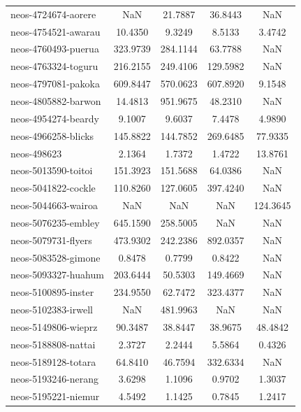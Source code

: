 \begin{longtable}{lcccc}
neos-4724674-aorere         &       NaN &  21.7887 &   36.8443 &       NaN \\
neos-4754521-awarau         &   10.4350 &   9.3249 &    8.5133 &    3.4742 \\
neos-4760493-puerua         &  323.9739 & 284.1144 &   63.7788 &       NaN \\
neos-4763324-toguru         &  216.2155 & 249.4106 &  129.5982 &       NaN \\
neos-4797081-pakoka         &  609.8447 & 570.0623 &  607.8920 &    9.1548 \\
neos-4805882-barwon         &   14.4813 & 951.9675 &   48.2310 &       NaN \\
neos-4954274-beardy         &    9.1007 &   9.6037 &    7.4478 &    4.9890 \\
neos-4966258-blicks         &  145.8822 & 144.7852 &  269.6485 &   77.9335 \\
neos-498623                 &    2.1364 &   1.7372 &    1.4722 &   13.8761 \\
neos-5013590-toitoi         &  151.3923 & 151.5688 &   64.0386 &       NaN \\
neos-5041822-cockle         &  110.8260 & 127.0605 &  397.4240 &       NaN \\
neos-5044663-wairoa         &       NaN &      NaN &       NaN &  124.3645 \\
neos-5076235-embley         &  645.1590 & 258.5005 &       NaN &       NaN \\
neos-5079731-flyers         &  473.9302 & 242.2386 &  892.0357 &       NaN \\
neos-5083528-gimone         &    0.8478 &   0.7799 &    0.8422 &       NaN \\
neos-5093327-huahum         &  203.6444 &  50.5303 &  149.4669 &       NaN \\
neos-5100895-inster         &  234.9550 &  62.7472 &  323.4377 &       NaN \\
neos-5102383-irwell         &       NaN & 481.9963 &       NaN &       NaN \\
neos-5149806-wieprz         &   90.3487 &  38.8447 &   38.9675 &   48.4842 \\
neos-5188808-nattai         &    2.3727 &   2.2444 &    5.5864 &    0.4326 \\
neos-5189128-totara         &   64.8410 &  46.7594 &  332.6334 &       NaN \\
neos-5193246-nerang         &    3.6298 &   1.1096 &    0.9702 &    1.3037 \\
neos-5195221-niemur         &    4.5492 &   1.1425 &    0.7845 &    1.2417 \\

\end{longtable}
